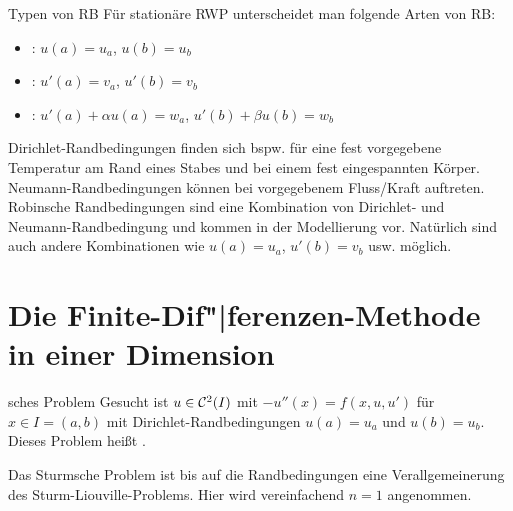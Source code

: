 \linie

\begin{Def}{Typen von RB}
    Für stationäre RWP unterscheidet man folgende Arten von RB:
    \begin{itemize}
        \item
        :
        $u(a) = u_a$, $u(b) = u_b$

        \item
        :
        $u'(a) = v_a$, $u'(b) = v_b$

        \item
        :
        $u'(a) + \alpha u(a) = w_a$, $u'(b) + \beta u(b) = w_b$
    \end{itemize}
\end{Def}

\begin{Bsp}
    Dirichlet-Randbedingungen finden sich bspw. für eine fest vorgegebene
    Temperatur am Rand eines Stabes und bei einem fest eingespannten Körper.
    Neumann-Randbedingungen können bei vorgegebenem Fluss/Kraft auftreten.
    Robinsche Randbedingungen sind eine Kombination von Dirichlet- und
    Neumann-Randbedin\-gung und kommen in der Modellierung vor.
    Natürlich sind auch andere Kombinationen wie
    $u(a) = u_a$, $u'(b) = v_b$ usw. möglich.
\end{Bsp}

\pagebreak

\section{%
    Die Finite-Dif"|ferenzen-Methode in einer Dimension%
}

\begin{Def}{sches Problem}
    Gesucht ist $u \in \mathcal{C}^2(I)$ mit $-u''(x) = f(x, u, u')$ für
    $x \in I = (a, b)$ mit Dirichlet-Randbedingungen
    $u(a) = u_a$ und $u(b) = u_b$.\\
    Dieses Problem heißt .
\end{Def}

\begin{Bem}
    Das Sturmsche Problem ist bis auf die Randbedingungen eine
    Verallgemeinerung des Sturm-Liouville-Problems.
    Hier wird vereinfachend $n = 1$ angenommen.
\end{Bem}

\linie

